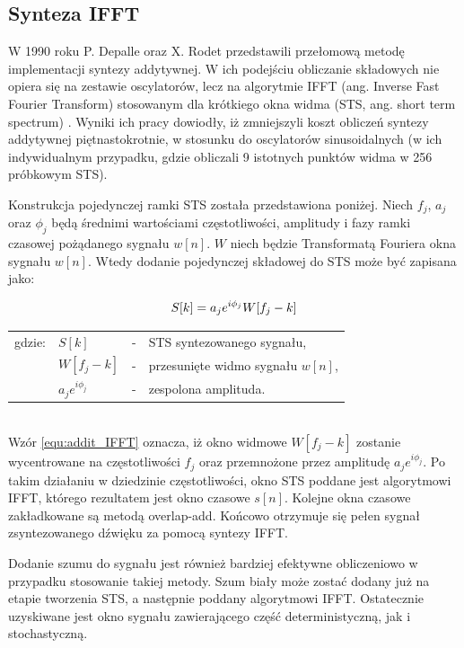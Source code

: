 \subsection{Synteza IFFT}
W 1990 roku P. Depalle oraz X. Rodet \cite{add_ifft_orig} przedstawili przełomową metodę implementacji syntezy addytywnej. W ich podejściu obliczanie składowych nie opiera się na zestawie oscylatorów, lecz na algorytmie IFFT (ang. Inverse Fast Fourier Transform) stosowanym dla krótkiego okna widma (STS, ang. short term spectrum) \cite{add_ifft_method}. Wyniki ich pracy dowiodły, iż zmniejszyli koszt obliczeń syntezy addytywnej piętnastokrotnie, w stosunku do oscylatorów sinusoidalnych (w ich indywidualnym przypadku, gdzie obliczali 9 istotnych punktów widma w 256 próbkowym STS).

Konstrukcja pojedynczej ramki STS została przedstawiona poniżej. Niech $f_{j}$, $a_{j}$ oraz $\phi_{j}$ będą średnimi wartościami częstotliwości, amplitudy i fazy ramki czasowej pożądanego sygnału $w[n]$. $W$ niech będzie Transformatą Fouriera okna sygnału $w[n]$. Wtedy dodanie pojedynczej składowej do STS może być zapisana jako:

\begin{equation} \label{equ:addit_IFFT}
S[k] = a_{j}e^{i\phi_{j}}W[f_{j} - k] \\  
\end{equation}
\begin{tabular}{ l l l l}
	gdzie: & $S[k]$ &  - & STS syntezowanego sygnału, \\
	& $W[f_{j} - k]$ &  - & przesunięte widmo sygnału $w[n]$, \\
	& $a_{j}e^{i\phi_{j}}$ & - & zespolona amplituda. \\
\end{tabular} \\

Wzór \ref{equ:addit_IFFT} oznacza, iż okno widmowe $W[f_{j} - k]$ zostanie wycentrowane na częstotliwości $f_{j}$ oraz przemnożone przez amplitudę $a_{j}e^{i\phi_{j}}$. Po takim działaniu w dziedzinie częstotliwości, okno STS poddane jest algorytmowi IFFT, którego rezultatem jest okno czasowe $s[n]$. Kolejne okna czasowe zakładkowane są metodą overlap-add. Końcowo otrzymuje się pełen sygnał zsyntezowanego dźwięku za pomocą syntezy IFFT.

Dodanie szumu do sygnału jest również bardziej efektywne obliczeniowo w przypadku stosowanie takiej metody. Szum biały może zostać dodany już na etapie tworzenia STS, a następnie poddany algorytmowi IFFT. Ostatecznie uzyskiwane jest okno sygnału zawierającego część deterministyczną, jak i stochastyczną.

